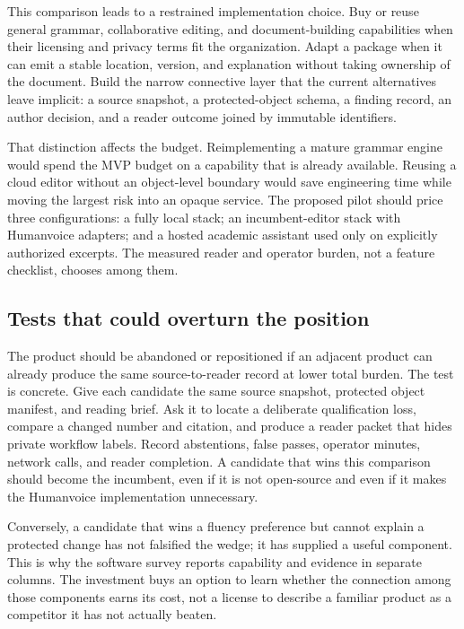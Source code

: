 This comparison leads to a restrained implementation choice. Buy or reuse
general grammar, collaborative editing, and document-building capabilities
when their licensing and privacy terms fit the organization. Adapt a package
when it can emit a stable location, version, and explanation without taking
ownership of the document. Build the narrow connective layer that the current
alternatives leave implicit: a source snapshot, a protected-object schema, a
finding record, an author decision, and a reader outcome joined by immutable
identifiers.

That distinction affects the budget. Reimplementing a mature grammar engine
would spend the MVP budget on a capability that is already available. Reusing a
cloud editor without an object-level boundary would save engineering time while
moving the largest risk into an opaque service. The proposed pilot should price three configurations: a fully local stack; an
incumbent-editor stack with Humanvoice adapters; and a hosted academic
assistant used only on explicitly authorized excerpts. The measured reader and
operator burden, not a feature checklist, chooses among them.

\subsection{Tests that could overturn the position}

The product should be abandoned or repositioned if an adjacent product can
already produce the same source-to-reader record at lower total burden. The
test is concrete. Give each candidate the same source snapshot, protected
object manifest, and reading brief. Ask it to locate a deliberate
qualification loss, compare a changed number and citation, and produce a
reader packet that hides private workflow labels. Record abstentions, false
passes, operator minutes, network calls, and reader completion. A candidate
that wins this comparison should become the incumbent, even if it is not
open-source and even if it makes the Humanvoice implementation unnecessary.

Conversely, a candidate that wins a fluency preference but cannot explain a
protected change has not falsified the wedge; it has supplied a useful
component. This is why the software survey reports capability and evidence in
separate columns. The investment buys an option to learn whether the
connection among those components earns its cost, not a license to describe a
familiar product as a competitor it has not actually beaten.

